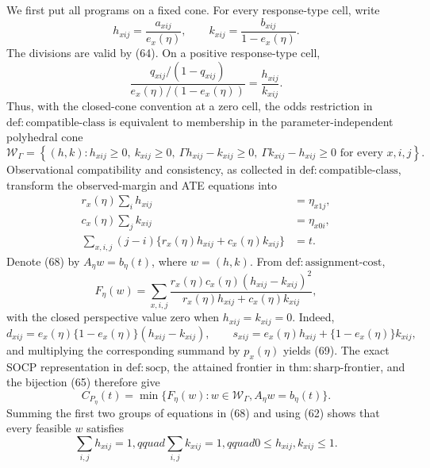 We first put all programs on a fixed cone.  For every response-type cell, write
\[
h_{xij}=\frac{a_{xij}}{e_x(\eta)},
\qquad
k_{xij}=\frac{b_{xij}}{1-e_x(\eta)}.
\tag{65}
\]
The divisions are valid by (64).  On a positive response-type cell,
\[
\frac{q_{xij}/(1-q_{xij})}{e_x(\eta)/(1-e_x(\eta))}
=\frac{h_{xij}}{k_{xij}}.
\tag{66}
\]
Thus, with the closed-cone convention at a zero cell, the odds restriction in \(\mathrm{def{:}compatible\mbox{-}class}\) is equivalent to membership in the parameter-independent polyhedral cone
\[
\mathcal W_\Gamma
=\left\{(h,k):
h_{xij}\geq0,\ k_{xij}\geq0,\
\Gamma h_{xij}-k_{xij}\geq0,\
\Gamma k_{xij}-h_{xij}\geq0
\text{ for every }x,i,j\right\}.
\tag{67}
\]
Observational compatibility and consistency, as collected in \(\mathrm{def{:}compatible\mbox{-}class}\), transform the observed-margin and ATE equations into
\[
\begin{aligned}
r_x(\eta)\sum_i h_{xij}&=\eta_{x1j},\\
c_x(\eta)\sum_j k_{xij}&=\eta_{x0i},\\
\sum_{x,i,j}(j-i)
\{r_x(\eta)h_{xij}+c_x(\eta)k_{xij}\}&=t.
\end{aligned}
\tag{68}
\]
Denote (68) by \(A_\eta w=b_\eta(t)\), where \(w=(h,k)\).  From \(\mathrm{def{:}assignment\mbox{-}cost}\),
\[
F_\eta(w)
=\sum_{x,i,j}
\frac{r_x(\eta)c_x(\eta)(h_{xij}-k_{xij})^2}
{r_x(\eta)h_{xij}+c_x(\eta)k_{xij}},
\tag{69}
\]
with the closed perspective value zero when \(h_{xij}=k_{xij}=0\).  Indeed,
\[
d_{xij}=e_x(\eta)\{1-e_x(\eta)\}(h_{xij}-k_{xij}),
\qquad
s_{xij}=e_x(\eta)h_{xij}+\{1-e_x(\eta)\}k_{xij},
\tag{70}
\]
and multiplying the corresponding summand by \(p_x(\eta)\) yields (69).  The exact SOCP representation in \(\mathrm{def{:}socp}\), the attained frontier in \(\mathrm{thm{:}sharp\mbox{-}frontier}\), and the bijection (65) therefore give
\[
C_{P_\eta}(t)
=\min\{F_\eta(w):w\in\mathcal W_\Gamma, A_\eta w=b_\eta(t)\}.
\tag{71}
\]
Summing the first two groups of equations in (68) and using (62) shows that every feasible \(w\) satisfies
\[
\sum_{i,j}h_{xij}=1,qquad
\sum_{i,j}k_{xij}=1,qquad
0\leq h_{xij},k_{xij}\leq1.
\tag{72}
\]

